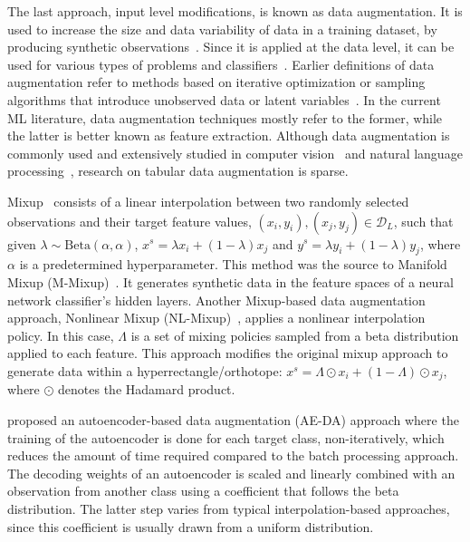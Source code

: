 \documentclass[parskip=full]{scrartcl}
\begin{document}
The last approach, input level modifications, is known as data augmentation.
It is used to increase the size and data variability of data in a training
dataset, by producing synthetic observations~\cite{Van2001, Wong2016}. Since
it is applied at the data level, it can be used for various types of problems
and classifiers~\cite{Behpour2019}. Earlier definitions of data augmentation
refer to methods based on iterative optimization or sampling algorithms that
introduce unobserved data or latent variables~\cite{van2001art}. In the
current ML literature, data augmentation techniques mostly refer to the
former, while the latter is better known as feature extraction. Although data
augmentation is commonly used and extensively studied in computer
vision~\cite{shorten2019survey} and natural language
processing~\cite{feng2021survey}, research on tabular data augmentation is
sparse.

Mixup~\cite{zhang2018mixup} consists of a linear interpolation between two
randomly selected observations and their target feature values, $(x_i, y_i),
(x_j, y_j) \in \mathcal{D}_L$, such that given $\lambda \sim
\text{Beta}(\alpha,\alpha)$, $x^s = \lambda x_i + (1-\lambda) x_j$ and $y^s =
\lambda y_i + (1-\lambda) y_j$, where $\alpha$ is a predetermined
hyperparameter. This method was the source to Manifold Mixup
(M-Mixup)~\cite{verma2019manifold}. It generates synthetic data in the feature
spaces of a neural network classifier's hidden layers. Another Mixup-based
data augmentation approach, Nonlinear Mixup
(NL-Mixup)~\cite{guo2020nonlinear}, applies a nonlinear interpolation policy.
In this case, $\Lambda$ is a set of mixing policies sampled from a beta
distribution applied to each feature. This approach modifies the original
mixup approach to generate data within a hyperrectangle/orthotope: $x^s =
\Lambda \odot x_i + (1-\Lambda) \odot x_j$, where $\odot$ denotes the Hadamard
product.

\citet{feng2020autuencoder} proposed an autoencoder-based data augmentation
(AE-DA) approach where the training of the autoencoder is done for each target
class, non-iteratively, which reduces the amount of time required compared to
the batch processing approach. The decoding weights of an autoencoder is
scaled and linearly combined with an observation from another class using a
coefficient that follows the beta distribution. The latter step varies from
typical interpolation-based approaches, since this coefficient is usually
drawn from a uniform distribution.
\end{document}
